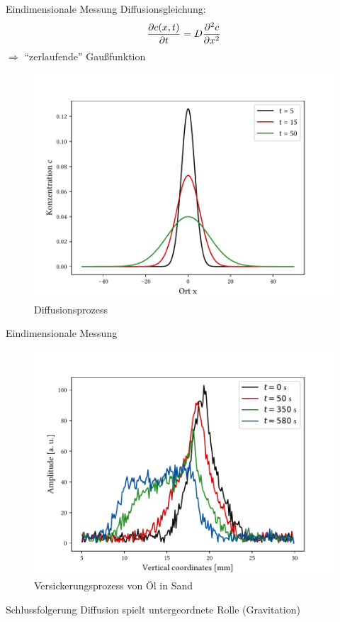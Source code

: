\begin{frame}{Eindimensionale Messung}
Diffusionsgleichung: %
	\begin{align*}
	\pdv{c(x,t)}{t}=D\pdv[2]{c}{x}
	\end{align*}
	$\Rightarrow$ \enquote{zerlaufende} Gaußfunktion
	\begin{figure}
	\centering
	\includegraphics[scale=.4]{..//figures//gaus.pdf}
	\caption{Diffusionsprozess}
	\end{figure}
\end{frame}

\begin{frame}{Eindimensionale Messung}
	\begin{figure}
	\centering
	\includegraphics[scale=.35]{..//figures//f61_abb_9.pdf}
	\caption{Versickerungsprozess von Öl in Sand}
	\end{figure}
	\begin{block}{Schlussfolgerung}
	Diffusion spielt untergeordnete Rolle (Gravitation)
	\end{block}
\end{frame}

